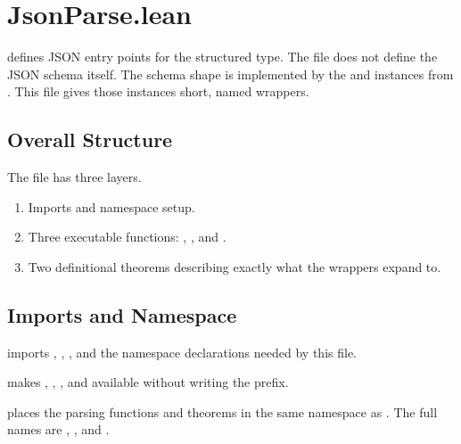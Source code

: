 \section{JsonParse.lean}

 defines JSON entry points for the structured
 type. The file does not define the JSON schema itself. The schema
shape is implemented by the  and 
instances from . This file gives those instances short,
named wrappers.

\subsection{Overall Structure}

The file has three layers.

\begin{enumerate}
  \item Imports and namespace setup.
  \item Three executable functions:
    , , and .
  \item Two definitional theorems describing exactly what the wrappers expand to.
\end{enumerate}

\subsection{Imports and Namespace}

\begin{definition}
 imports , ,
, and the  namespace declarations needed
by this file.
\end{definition}

\begin{definition}
 makes , , , and
 available without writing the  prefix.
\end{definition}

\begin{definition}
 places the parsing functions and theorems in
the same namespace as . The full names are
, , and
.
\end{definition}

